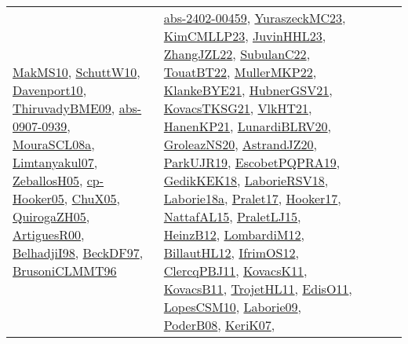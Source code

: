 {\begin{longtable}{lp{3cm}>{\raggedright}p{6cm}>{\raggedright}p{6cm}p{8cm}}
\href{papers/MakMS10.pdf}{MakMS10}\cite{MakMS10}, \href{papers/SchuttW10.pdf}{SchuttW10}\cite{SchuttW10}, \href{papers/Davenport10.pdf}{Davenport10}\cite{Davenport10}, \href{papers/ThiruvadyBME09.pdf}{ThiruvadyBME09}\cite{ThiruvadyBME09}, \href{articles/abs-0907-0939.pdf}{abs-0907-0939}\cite{abs-0907-0939}, \href{papers/MouraSCL08a.pdf}{MouraSCL08a}\cite{MouraSCL08a}, \href{papers/Limtanyakul07.pdf}{Limtanyakul07}\cite{Limtanyakul07}, \href{articles/ZeballosH05.pdf}{ZeballosH05}\cite{ZeballosH05}, \href{papers/cp-Hooker05.pdf}{cp-Hooker05}\cite{cp-Hooker05}, \href{papers/ChuX05.pdf}{ChuX05}\cite{ChuX05}, \href{papers/QuirogaZH05.pdf}{QuirogaZH05}\cite{QuirogaZH05}, \href{articles/ArtiguesR00.pdf}{ArtiguesR00}\cite{ArtiguesR00}, \href{articles/BelhadjiI98.pdf}{BelhadjiI98}\cite{BelhadjiI98}, \href{papers/BeckDF97.pdf}{BeckDF97}\cite{BeckDF97}, \href{papers/BrusoniCLMMT96.pdf}{BrusoniCLMMT96}\cite{BrusoniCLMMT96} & \href{articles/abs-2402-00459.pdf}{abs-2402-00459}\cite{abs-2402-00459}, \href{papers/YuraszeckMC23.pdf}{YuraszeckMC23}\cite{YuraszeckMC23}, \href{papers/KimCMLLP23.pdf}{KimCMLLP23}\cite{KimCMLLP23}, \href{papers/JuvinHHL23.pdf}{JuvinHHL23}\cite{JuvinHHL23}, \href{papers/ZhangJZL22.pdf}{ZhangJZL22}\cite{ZhangJZL22}, \href{articles/SubulanC22.pdf}{SubulanC22}\cite{SubulanC22}, \href{papers/TouatBT22.pdf}{TouatBT22}\cite{TouatBT22}, \href{articles/MullerMKP22.pdf}{MullerMKP22}\cite{MullerMKP22}, \href{papers/KlankeBYE21.pdf}{KlankeBYE21}\cite{KlankeBYE21}, \href{articles/HubnerGSV21.pdf}{HubnerGSV21}\cite{HubnerGSV21}, \href{papers/KovacsTKSG21.pdf}{KovacsTKSG21}\cite{KovacsTKSG21}, \href{articles/VlkHT21.pdf}{VlkHT21}\cite{VlkHT21}, \href{papers/HanenKP21.pdf}{HanenKP21}\cite{HanenKP21}, \href{articles/LunardiBLRV20.pdf}{LunardiBLRV20}\cite{LunardiBLRV20}, \href{papers/GroleazNS20.pdf}{GroleazNS20}\cite{GroleazNS20}, \href{articles/AstrandJZ20.pdf}{AstrandJZ20}\cite{AstrandJZ20}, \href{papers/ParkUJR19.pdf}{ParkUJR19}\cite{ParkUJR19}, \href{articles/EscobetPQPRA19.pdf}{EscobetPQPRA19}\cite{EscobetPQPRA19}, \href{articles/GedikKEK18.pdf}{GedikKEK18}\cite{GedikKEK18}, \href{articles/LaborieRSV18.pdf}{LaborieRSV18}\cite{LaborieRSV18}, \href{papers/Laborie18a.pdf}{Laborie18a}\cite{Laborie18a}, \href{papers/Pralet17.pdf}{Pralet17}\cite{Pralet17}, \href{papers/Hooker17.pdf}{Hooker17}\cite{Hooker17}, \href{articles/NattafAL15.pdf}{NattafAL15}\cite{NattafAL15}, \href{papers/PraletLJ15.pdf}{PraletLJ15}\cite{PraletLJ15}, \href{papers/HeinzB12.pdf}{HeinzB12}\cite{HeinzB12}, \href{articles/LombardiM12.pdf}{LombardiM12}\cite{LombardiM12}, \href{papers/BillautHL12.pdf}{BillautHL12}\cite{BillautHL12}, \href{papers/IfrimOS12.pdf}{IfrimOS12}\cite{IfrimOS12}, \href{papers/ClercqPBJ11.pdf}{ClercqPBJ11}\cite{ClercqPBJ11}, \href{articles/KovacsK11.pdf}{KovacsK11}\cite{KovacsK11}, \href{articles/KovacsB11.pdf}{KovacsB11}\cite{KovacsB11}, \href{articles/TrojetHL11.pdf}{TrojetHL11}\cite{TrojetHL11}, \href{papers/EdisO11.pdf}{EdisO11}\cite{EdisO11}, \href{articles/LopesCSM10.pdf}{LopesCSM10}\cite{LopesCSM10}, \href{papers/Laborie09.pdf}{Laborie09}\cite{Laborie09}, \href{papers/PoderB08.pdf}{PoderB08}\cite{PoderB08}, \href{papers/KeriK07.pdf}{KeriK07}\cite{KeriK07}, 
\end{longtable}}
